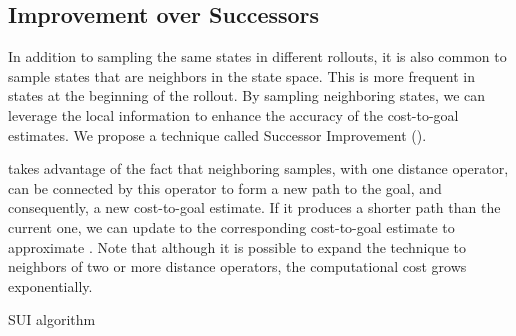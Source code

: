 \subsection{Improvement over Successors}
\label{sec:hvfc}

In addition to sampling the same states in different rollouts, it is also common to sample states that are neighbors in the state space. This is more frequent in states at the beginning of the rollout. By sampling neighboring states, we can leverage the local information to enhance the accuracy of the cost-to-goal estimates. We propose a technique called Successor Improvement (\hvfc).

\hvfc takes advantage of the fact that neighboring samples, with one distance operator, can be connected by this operator to form a new path to the goal, and consequently, a new cost-to-goal estimate. If it produces a shorter path than the current one, we can update to the corresponding cost-to-goal estimate to approximate \hstar. Note that although it is possible to expand the technique to neighbors of two or more distance operators, the computational cost grows exponentially.

\begin{algorithm}[ht]
    \SetAlgoLined




    \caption{SUI algorithm}
    \label{alg:sui}
\end{algorithm}

